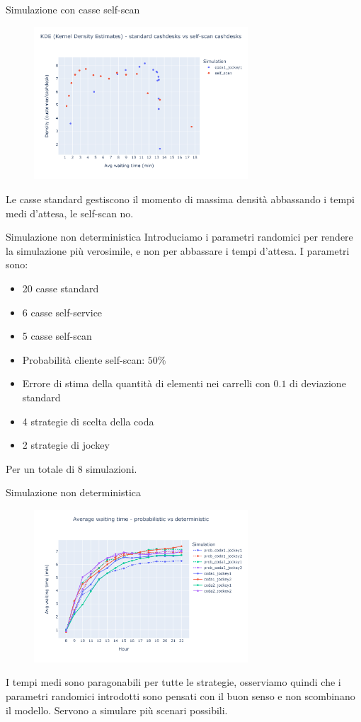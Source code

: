\begin{frame}{Simulazione con casse self-scan}
	\begin{figure}[H]
		\centering
		\includegraphics[width=8cm]{"../report/images/results/kde_self_scan.png"}
	\end{figure}
	Le casse standard gestiscono il momento di massima densità abbassando i tempi medi d'attesa, le self-scan no.
\end{frame}

\begin{frame}{Simulazione non deterministica}
	Introduciamo i parametri randomici per rendere la simulazione più verosimile, e non per abbassare i tempi d'attesa. I parametri sono:
	\begin{itemize}
		\item 20 casse standard
		\item 6 casse self-service
		\item 5 casse self-scan
		\item Probabilità cliente self-scan: $50 \%$
		\item Errore di stima della quantità di elementi nei carrelli con $0.1$ di deviazione standard
		\item 4 strategie di scelta della coda
		\item 2 strategie di jockey
	\end{itemize}
	Per un totale di 8 simulazioni.
\end{frame}

\begin{frame}{Simulazione non deterministica}
	\begin{figure}[H]
		\centering
		\includegraphics[width=8cm]{"../report/images/results/avg_wt_prob.png"}
	\end{figure}
	I tempi medi sono paragonabili per tutte le strategie, osserviamo quindi che i parametri randomici introdotti sono pensati con il buon senso e non scombinano il modello. Servono a simulare più scenari possibili.
\end{frame}